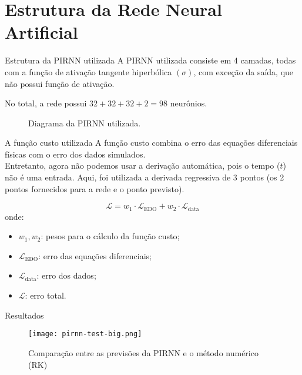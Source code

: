 \section{Estrutura da Rede Neural Artificial}

\begin{frame}{Estrutura da PIRNN utilizada}
  A PIRNN utilizada consiste em 4 camadas, todas com a função de ativação tangente hiperbólica $(\sigma)$, com exceção da saída, que não possui função de ativação.

  No total, a rede possui $32+32+32+2=98$ neurônios.

  \begin{figure}
    \centering
    \resizebox{0.45\textwidth}{!}{}
    \caption{Diagrama da PIRNN utilizada.}
  \end{figure}
\end{frame}

\begin{frame}{A função custo utilizada}
  A função custo combina o erro das equações diferenciais físicas com o erro dos dados simulados.
  \\ \vspace{0.2cm}
  Entretanto, agora não podemos usar a derivação automática, pois o tempo ($t$) não é uma entrada. Aqui, foi utilizada a derivada regressiva de 3 pontos (os 2 pontos fornecidos para a rede e o ponto previsto).

  \begin{equation}
    \mathcal{L} = w_1 \cdot \mathcal{L}_{\text{EDO}} + w_2 \cdot \mathcal{L}_{\text{data}}
  \end{equation}
  onde:
  \begin{itemize}
    \item $w_1, w_2$: pesos para o cálculo da função custo;
    \item $\mathcal{L}_{\text{EDO}}$: erro das equações diferenciais;
    \item $\mathcal{L}_{\text{data}}$: erro dos dados;
    \item $\mathcal{L}$: erro total.
  \end{itemize}
\end{frame}

\begin{frame}{Resultados}
  \begin{figure}
    \centering
    \texttt{[image: pirnn-test-big.png]}
    \caption{Comparação entre as previsões da PIRNN e o método numérico (RK)}
  \end{figure}
\end{frame}

